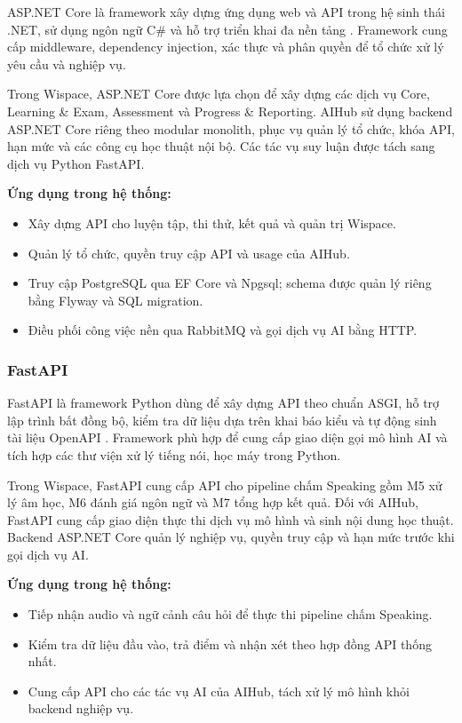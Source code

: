 ASP.NET Core là framework xây dựng ứng dụng web và API trong hệ sinh thái .NET, sử dụng ngôn ngữ C\# và hỗ trợ triển khai đa nền tảng \parencite{ch4_aspnet_overview}. Framework cung cấp middleware, dependency injection, xác thực và phân quyền để tổ chức xử lý yêu cầu và nghiệp vụ.

Trong Wispace, ASP.NET Core được lựa chọn để xây dựng các dịch vụ Core, Learning \& Exam, Assessment và Progress \& Reporting. AIHub sử dụng backend ASP.NET Core riêng theo modular monolith, phục vụ quản lý tổ chức, khóa API, hạn mức và các công cụ học thuật nội bộ. Các tác vụ suy luận được tách sang dịch vụ Python FastAPI.

\textbf{Ứng dụng trong hệ thống:}
\begin{itemize}
    \item Xây dựng API cho luyện tập, thi thử, kết quả và quản trị Wispace.
    \item Quản lý tổ chức, quyền truy cập API và usage của AIHub.
    \item Truy cập PostgreSQL qua EF Core và Npgsql; schema được quản lý riêng bằng Flyway và SQL migration.
    \item Điều phối công việc nền qua RabbitMQ và gọi dịch vụ AI bằng HTTP.
\end{itemize}


\subsubsection{FastAPI}

FastAPI là framework Python dùng để xây dựng API theo chuẩn ASGI, hỗ trợ lập trình bất đồng bộ, kiểm tra dữ liệu dựa trên khai báo kiểu và tự động sinh tài liệu OpenAPI \parencite{fastapidocs2024}. Framework phù hợp để cung cấp giao diện gọi mô hình AI và tích hợp các thư viện xử lý tiếng nói, học máy trong Python.

Trong Wispace, FastAPI cung cấp API cho pipeline chấm Speaking gồm M5 xử lý âm học, M6 đánh giá ngôn ngữ và M7 tổng hợp kết quả. Đối với AIHub, FastAPI cung cấp giao diện thực thi dịch vụ mô hình và sinh nội dung học thuật. Backend ASP.NET Core quản lý nghiệp vụ, quyền truy cập và hạn mức trước khi gọi dịch vụ AI.

\textbf{Ứng dụng trong hệ thống:}
\begin{itemize}
    \item Tiếp nhận audio và ngữ cảnh câu hỏi để thực thi pipeline chấm Speaking.
    \item Kiểm tra dữ liệu đầu vào, trả điểm và nhận xét theo hợp đồng API thống nhất.
    \item Cung cấp API cho các tác vụ AI của AIHub, tách xử lý mô hình khỏi backend nghiệp vụ.
\end{itemize}

